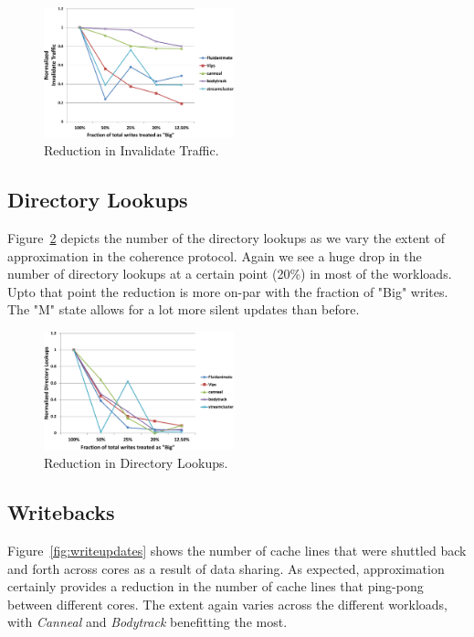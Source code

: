 \begin{figure}[t] \centering 
\centering
\includegraphics[width=0.49\textwidth]{figures/Invalidates-crop.pdf}
\caption{Reduction in Invalidate Traffic.}
\label{fig:invalidates}
\end{figure}

\subsection{Directory Lookups}
Figure~\ref{fig:lookups} depicts the number of the directory lookups as we vary
the extent
of approximation in the coherence protocol. Again we see a huge drop in the
number of directory lookups at a certain point (20\%) in most of the workloads.
Upto that point the reduction is more on-par with the fraction of "Big" writes.
The "M" state allows for a lot more silent updates than before.  

\begin{figure}[t] \centering 
\centering
\includegraphics[width=0.49\textwidth]{figures/Lookups-crop.pdf}
\caption{Reduction in Directory Lookups.}
\label{fig:lookups}
\end{figure}

\subsection{Writebacks}
Figure~\ref{fig:writeupdates} shows the number of cache lines that were shuttled
back and forth across cores as a result of data sharing. As expected,
approximation certainly provides a reduction in the number of cache lines that
ping-pong between different cores. The extent again varies across the different
workloads, with \emph{Canneal} and \emph{Bodytrack} benefitting the most.  
 
